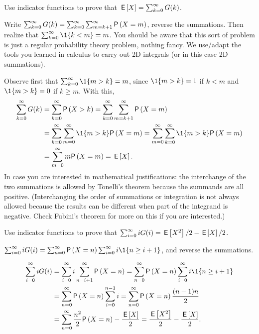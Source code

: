 \documentclass[companion.tex]{subfiles}
\begin{document}
\begin{extra}
 Use indicator functions to prove that $\,\mathsf{E}\left[X\right] = \sum_{k=0}^\infty G(k)$.
\begin{hint}
Write 
$\sum_{k=0}^\infty G(k) = \sum_{k=0}^\infty \sum_{m=k+1}^\infty \P{X=m}$, reverse the summations. Then realize that $\sum_{k=0}^\infty \1{k<m} = m$. 
You should be aware that this sort of problem is just a regular probability
 theory problem, nothing fancy. We use/adapt the tools you learned in
 calculus to carry out 2D integrals (or in this case 2D summations).
\end{hint}
\begin{solution}
Observe first that $\sum_{k=0}^\infty \1{m>k} = m$, since $\1{m>k}=1$ if $k<m$ and $\1{m>k} = 0$ if $k\geq m$. With this, 
\begin{align*}
\sum_{k=0}^\infty G(k) 
&= \sum_{k=0}^\infty \P{X>k} 
= \sum_{k=0}^\infty \sum_{m=k+1}^\infty \P{X=m} \\
& = \sum_{k=0}^\infty \sum_{m=0}^\infty \1{m>k} \P{X=m} 
= \sum_{m=0}^\infty \sum_{k=0}^\infty \1{m>k} \P{X=m} \\
&= \sum_{m=0}^\infty m\P{X=m} = \E X.
\end{align*}
In case you are interested in mathematical justifications: the interchange of the two summations is allowed by Tonelli's theorem because the summands are all positive.
(Interchanging the order of summations or integration is not always allowed because the results can be different when part of the integrand is negative.
Check Fubini's theorem for more on this if you are interested.)
\end{solution}
\end{extra}

\begin{exercise}
 Use indicator functions to prove that
$\sum_{i=0}^\infty i G(i) = \,\mathsf{E}\left[X^2\right]/2 - \,\mathsf{E}\left[X\right]/2$.
\begin{hint}
$\sum_{i=0}^\infty i G(i) = \sum_{n=0}^\infty \P{X=n} \sum_{i=0}^\infty i \1{n\geq i+1}$,
and reverse the summations.
\end{hint}
\begin{solution}
\begin{align*}
\sum_{i=0}^\infty i G(i)
&= \sum_{i=0}^\infty i \sum_{n=i+1}^\infty \P{X=n} = \sum_{n=0}^\infty \P{X=n} \sum_{i=0}^\infty i \1{n\geq i+1} \\
&= \sum_{n=0}^\infty \P{X=n} \sum_{i=0}^{n-1}i = \sum_{n=0}^\infty \P{X=n} \frac{(n-1)n}{2} \\
&= \sum_{n=0}^\infty \frac{n^2}{2} \P{X=n} - \frac{\E X}{2}
= \frac{\E{X^2}}{2} - \frac{\E X}{2}.
\end{align*}
\end{solution}
\end{exercise}
\end{document}
